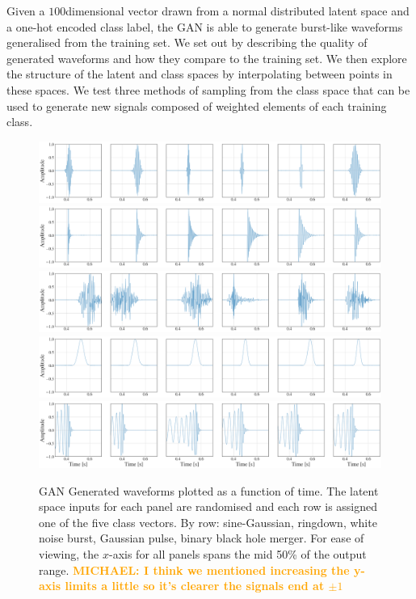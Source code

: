 \documentclass[12pt]{iopart}
\newcommand{\michael}[1]{\textbf{\textcolor{orange}{MICHAEL: #1}}}
\newcommand{\ndimensional}[1]{$#1$\nobreakdash\discretionary{-}{-}{-}dimensional}
\begin{document}
%
Given a \ndimensional{100} vector drawn from a normal distributed latent space and a one-hot encoded class
label, the GAN is able to generate burst-like waveforms generalised from the
training set. We set out by describing the quality of generated waveforms and
how they compare to the training set. We then explore the structure of the
latent and class spaces by interpolating between points in these spaces. We
test three methods of sampling from the class space that can be used to generate new signals composed of weighted elements of each training class.

\begin{figure}[!h]
    \centering
    \includegraphics[width=\textwidth]{figures/generations/sg.png}
    \includegraphics[width=\textwidth]{figures/generations/rd.png}
    \includegraphics[width=\textwidth]{figures/generations/wnb.png}
    \includegraphics[width=\textwidth]{figures/generations/blip.png}
    \includegraphics[width=\textwidth]{figures/generations/bbh.png}
    \caption{\ac{GAN} Generated waveforms plotted as a function of time. The latent space inputs for each panel are randomised and each row is assigned one of the five class vectors. By row: sine-Gaussian, ringdown,
white noise burst, Gaussian pulse, binary black hole merger. For ease of viewing, the $x$-axis for all panels spans the mid 50\% of the output range. \michael{I think we mentioned increasing the y-axis limits a little so it's clearer the signals end at $\pm 1$}}
\label{fig:gen_signals} 
\end{figure}
\end{document}
